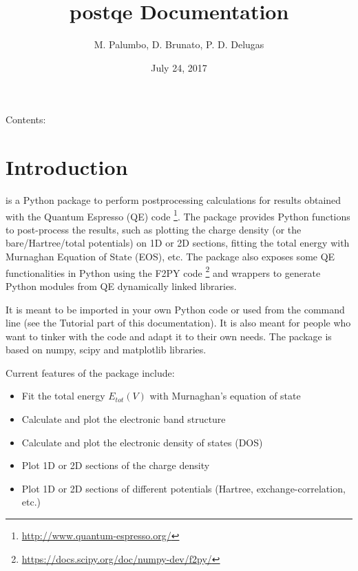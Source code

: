 \documentclass[letterpaper,10pt,english]{sphinxmanual}
\title{postqe Documentation}
\date{July 24, 2017}
\author{M. Palumbo, D. Brunato, P. D. Delugas}
\begin{document}
\maketitle
\tableofcontents
{}\label{index::doc}


Contents:


\chapter{Introduction}
\label{introduction:introduction}\label{introduction:id1}\label{introduction::doc}\label{introduction:welcome-to-postqe-s-documentation}
 is a Python package to perform postprocessing calculations for results obtained with the Quantum Espresso (QE) code \footnote[1]{
\href{http://www.quantum-espresso.org/}{http://www.quantum-espresso.org/}
}. The package provides Python functions to post-process the results, such as plotting the charge density (or the bare/Hartree/total potentials) on 1D or 2D sections, fitting the total energy with Murnaghan Equation of State (EOS), etc. The package also exposes some QE functionalities in Python using the F2PY code \footnote[2]{
\href{https://docs.scipy.org/doc/numpy-dev/f2py/}{https://docs.scipy.org/doc/numpy-dev/f2py/}
} and wrappers to generate Python modules from QE dynamically linked libraries.

It is meant to be imported in your own Python code or used from the command line (see the Tutorial part of this documentation). It is also meant for people who want to tinker with the code and adapt it to their own needs. The package is based on numpy, scipy and matplotlib libraries.

Current features of the package include:
\begin{itemize}
\item {} 
Fit the total energy \(E_{tot}(V)\) with Murnaghan's equation of state

\item {} 
Calculate and plot the electronic band structure

\item {} 
Calculate and plot the electronic density of states (DOS)

\item {} 
Plot 1D or 2D sections of the charge density

\item {} 
Plot 1D or 2D sections of different potentials (Hartree, exchange-correlation, etc.)

\end{itemize}
\end{document}
